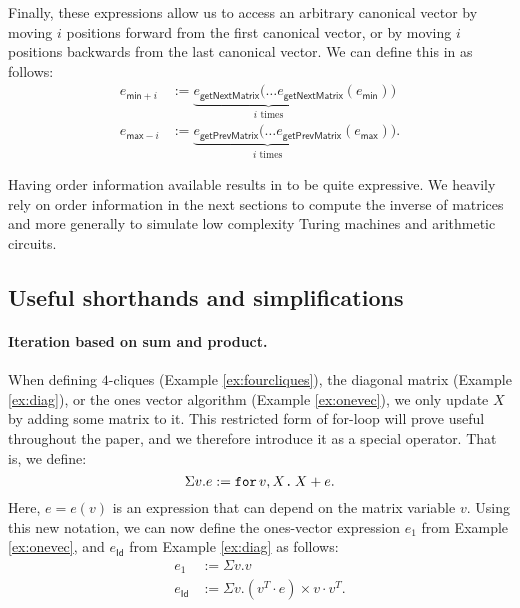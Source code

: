 Finally, these expressions allow us to access an arbitrary canonical vector by moving $i$ positions forward from the first canonical vector, or by moving $i$ positions backwards from the last canonical vector. We can define this in \langfor as follows:  
\begin{align*}
e_{\mathsf{min}+i} &:= \underbrace{e_{\mathsf{getNextMatrix}}(\ldots e_{\mathsf{getNextMatrix}}}_{i \text{ times}}(e_{\mathsf{min}}))\\
e_{\mathsf{max}-i} &:= \underbrace{e_{\mathsf{getPrevMatrix}}(\ldots e_{\mathsf{getPrevMatrix}}}_{i \text{ times}}(e_{\mathsf{max}})).
\end{align*}

Having order information available results in \langfor to be quite expressive.
We heavily rely on order information in the next sections to compute the inverse of matrices and more generally to simulate low complexity Turing machines and arithmetic circuits.


\subsection{Useful shorthands and simplifications}\label{sec:queries:simp}

\paragraph{Iteration based on sum and product.} When defining $4$-cliques (Example \ref{ex:fourcliques}), the diagonal matrix (Example \ref{ex:diag}), or the ones vector algorithm (Example \ref{ex:onevec}), we 
 only update $X$ by adding some matrix to it. This restricted form of for-loop will prove useful throughout the paper, and we therefore introduce it as a special operator. That is, we define:
$$\Sigma v. e := \texttt{for}\, v,X \texttt{.}\, X + e.$$
Here, $e=e(v)$ is an expression that can depend on the matrix variable $v$. 
Using this new notation, we can now define the ones-vector expression $e_1$ from Example \ref{ex:onevec}, and $e_\mathsf{Id}$ from Example \ref{ex:diag} as follows:
\begin{align*}
e_1 &:= \Sigma v. v\\
e_\mathsf{Id} &:= \Sigma v. (v^T\cdot e)\times v\cdot v^T.
\end{align*}

